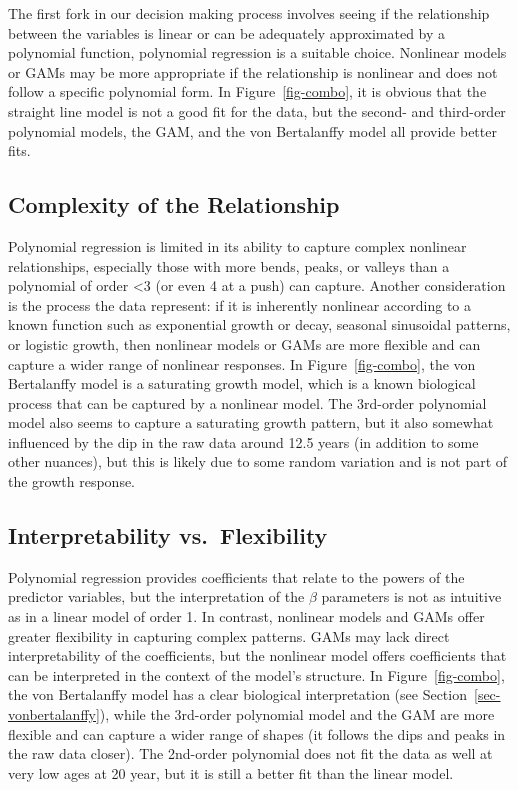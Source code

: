 \documentclass[
  letterpaper,
]{book}
\begin{document}
The first fork in our decision making process involves seeing if the
relationship between the variables is linear or can be adequately
approximated by a polynomial function, polynomial regression is a
suitable choice. Nonlinear models or GAMs may be more appropriate if the
relationship is nonlinear and does not follow a specific polynomial
form. In Figure~\ref{fig-combo}, it is obvious that the straight line
model is not a good fit for the data, but the second- and third-order
polynomial models, the GAM, and the von Bertalanffy model all provide
better fits.

\subsection{Complexity of the
Relationship}\label{complexity-of-the-relationship}

Polynomial regression is limited in its ability to capture complex
nonlinear relationships, especially those with more bends, peaks, or
valleys than a polynomial of order \textless3 (or even 4 at a push) can
capture. Another consideration is the process the data represent: if it
is inherently nonlinear according to a known function such as
exponential growth or decay, seasonal sinusoidal patterns, or logistic
growth, then nonlinear models or GAMs are more flexible and can capture
a wider range of nonlinear responses. In Figure~\ref{fig-combo}, the von
Bertalanffy model is a saturating growth model, which is a known
biological process that can be captured by a nonlinear model. The
3rd-order polynomial model also seems to capture a saturating growth
pattern, but it also somewhat influenced by the dip in the raw data
around 12.5 years (in addition to some other nuances), but this is
likely due to some random variation and is not part of the growth
response.

\subsection{Interpretability
vs.~Flexibility}\label{interpretability-vs.-flexibility}

Polynomial regression provides coefficients that relate to the powers of
the predictor variables, but the interpretation of the \(\beta\)
parameters is not as intuitive as in a linear model of order 1. In
contrast, nonlinear models and GAMs offer greater flexibility in
capturing complex patterns. GAMs may lack direct interpretability of the
coefficients, but the nonlinear model offers coefficients that can be
interpreted in the context of the model's structure. In
Figure~\ref{fig-combo}, the von Bertalanffy model has a clear biological
interpretation (see Section~\ref{sec-vonbertalanffy}), while the
3rd-order polynomial model and the GAM are more flexible and can capture
a wider range of shapes (it follows the dips and peaks in the raw data
closer). The 2nd-order polynomial does not fit the data as well at very
low ages at 20 year, but it is still a better fit than the linear model.
\end{document}
